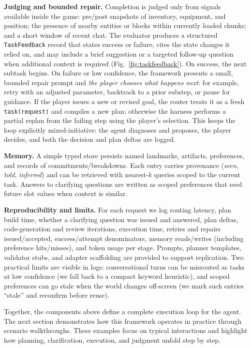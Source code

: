 \noindent\textbf{Judging and bounded repair.}
Completion is judged only from signals available inside the game: pre/post snapshots of inventory, equipment, and position; the presence of nearby entities or blocks within currently loaded chunks; and a short window of recent chat. The evaluator produces a structured \texttt{TaskFeedback} record that states success or failure, cites the state changes it relied on, and may include a brief suggestion or a targeted follow-up question when additional context is required (Fig.~\ref{fig:taskfeedback}). On success, the next subtask begins. On failure or low confidence, the framework presents a small, bounded repair prompt and \emph{the player chooses what happens next}: for example, retry with an adjusted parameter, backtrack to a prior substep, or pause for guidance. If the player issues a new or revised goal, the router treats it as a fresh \texttt{task(request)} and compiles a new plan; otherwise the harness performs a partial replan from the failing step using the player’s selection. This keeps the loop explicitly mixed-initiative: the agent diagnoses and proposes, the player decides, and both the decision and plan deltas are logged.

\medskip
\noindent
\textbf{Memory.}
A simple typed store persists named landmarks, artifacts, preferences, and records of commitments/breakdowns. Each entry carries provenance (\textit{seen}, \textit{told}, \textit{inferred}) and can be retrieved with nearest-$k$ queries scoped to the current task. Answers to clarifying questions are written as scoped preferences that seed future slot values when context is similar.

\medskip
\noindent
\textbf{Reproducibility and limits.}
For each request we log routing latency, plan build time, whether a clarifying question was issued and answered, plan deltas, code-generation and review iterations, execution time, retries and repairs issued/accepted, success/attempt denominators, memory reads/writes (including preference hits/misses), and token usage per stage. Prompts, planner templates, validator stubs, and adapter scaffolding are provided to support replication. Two practical limits are visible in logs: conversational turns can be misrouted as tasks at low confidence (we fall back to a compact keyword heuristic), and scoped preferences can go stale when the world changes off-screen (we mark such entries “stale” and reconfirm before reuse).

\medskip
\noindent
Together, the components above define a complete execution loop for the agent. The next section demonstrates how this framework operates in practice through scenario walkthroughs. These examples focus on typical interactions and highlight how planning, clarification, execution, and judgment unfold step by step.

